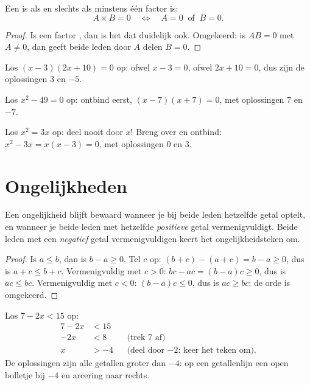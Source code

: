 \begin{theorem}[Nulproductregel]\label{thm:g9:algebra:zeroproduct}
Een  is  als en slechts als minstens één factor  is:
\[
A \times B = 0
\quad\Longleftrightarrow\quad
A = 0 \ \text{ of } \ B = 0 .
\]
\end{theorem}

\begin{proof}
Is een factor , dan is het  dat duidelijk ook. Omgekeerd: is $A B = 0$
met $A \neq 0$, dan geeft beide leden door $A$ delen $B = 0$.
\end{proof}

\begin{example}\label{ex:g9:algebra:zeroproduct}
Los $(x - 3)(2x + 10) = 0$ op: ofwel $x - 3 = 0$, ofwel $2x + 10 = 0$, dus zijn de
oplossingen $3$ en $-5$.

Los $x^2 - 49 = 0$ op: ontbind eerst, $(x-7)(x+7) = 0$, met oplossingen $7$ en
$-7$.

Los $x^2 = 3x$ op: deel nooit door $x$! Breng over en ontbind:
$x^2 - 3x = x(x - 3) = 0$, met oplossingen $0$ en $3$.
\end{example}

\section{Ongelijkheden}

\begin{proposition}\label{prop:g9:algebra:ineq}
Een ongelijkheid blijft bewaard wanneer je bij beide leden hetzelfde getal
optelt, en wanneer je beide leden met hetzelfde \emph{positieve} getal
vermenigvuldigt. Beide leden met een \emph{negatief} getal vermenigvuldigen keert
het ongelijkheidsteken om.
\end{proposition}

\begin{proof}
Is $a \leq b$, dan is $b - a \geq 0$. Tel $c$ op:
$(b+c) - (a+c) = b - a \geq 0$, dus is $a + c \leq b + c$. Vermenigvuldig met
$c > 0$: $bc - ac = (b-a)c \geq 0$, dus is $ac \leq bc$. Vermenigvuldig met
$c < 0$: $(b-a)c \leq 0$, dus is $ac \geq bc$: de orde is omgekeerd.
\end{proof}

\begin{example}\label{ex:g9:algebra:ineq}
Los $7 - 2x < 15$ op:
\begin{align*}
7 - 2x &< 15 \\
-2x &< 8 && \text{(trek 7 af)} \\
x &> -4 && \text{(deel door $-2$: keer het teken om).}
\end{align*}
De oplossingen zijn alle getallen groter dan $-4$: op een getallenlijn een open
bolletje bij $-4$ en arcering naar rechts.
\end{example}

